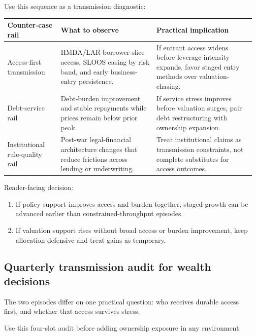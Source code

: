 \documentclass[11pt,openany]{book}
\begin{document}
Use this sequence as a transmission diagnostic:
\begin{center}
\small
\begin{tabularx}{\textwidth}{>{\raggedright\arraybackslash}p{}>{\raggedright\arraybackslash}p{}X}
\toprule
\textbf{Counter-case rail} & \textbf{What to observe} & \textbf{Practical implication} \\
\midrule
Access-first transmission & HMDA/LAR borrower-slice access, SLOOS easing by risk band, and early business-entry persistence. & If entrant access widens before leverage intensity expands, favor staged entry methods over valuation-chasing. \\
Debt-service rail & Debt-burden improvement and stable repayments while prices remain below prior peak. & If service stress improves before valuation surges, pair debt restructuring with ownership expansion. \\
Institutional rule-quality rail & Post-war legal-financial architecture changes that reduce frictions across lending or underwriting. & Treat institutional claims as transmission constraints, not complete substitutes for access outcomes. \\
\bottomrule
\end{tabularx}
\normalsize
\end{center}

Reader-facing decision:
\begin{enumerate}
  \item If policy support improves access and burden together, staged growth can be advanced earlier than constrained-throughput episodes.
  \item If valuation support rises without broad access or burden improvement, keep allocation defensive and treat gains as temporary.
\end{enumerate}

\subsection{Quarterly transmission audit for wealth decisions}
\label{subsec:quarterly-transmission-audit}

The two episodes differ on one practical question: who receives durable access first, and whether that access survives stress.

Use this four-slot audit before adding ownership exposure in any environment.
\end{document}
